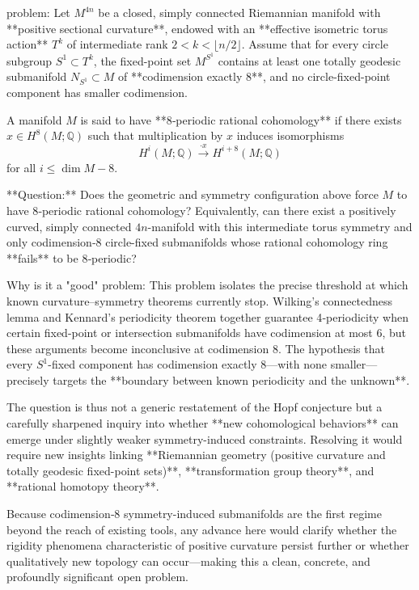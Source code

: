 problem:  
Let \( M^{4n} \) be a closed, simply connected Riemannian manifold with **positive sectional curvature**, endowed with an **effective isometric torus action** \( T^k \) of intermediate rank \( 2 < k < \lfloor n/2 \rfloor \).  
Assume that for every circle subgroup \( S^1 \subset T^k \), the fixed-point set \( M^{S^1} \) contains at least one totally geodesic submanifold \( N_{S^1} \subset M \) of **codimension exactly \(8\)**, and no circle-fixed-point component has smaller codimension.  

A manifold \(M\) is said to have **8‑periodic rational cohomology** if there exists \(x \in H^8(M;\mathbb{Q})\) such that multiplication by \(x\) induces isomorphisms  
\[
H^i(M;\mathbb{Q}) \xrightarrow{\cdot x} H^{i+8}(M;\mathbb{Q})
\]
for all \( i \le \dim M - 8.\)  

**Question:**  
Does the geometric and symmetry configuration above force \(M\) to have 8‑periodic rational cohomology?  
Equivalently, can there exist a positively curved, simply connected \(4n\)-manifold with this intermediate torus symmetry and only codimension‑8 circle-fixed submanifolds whose rational cohomology ring **fails** to be 8‑periodic?

Why is it a "good" problem:  
This problem isolates the precise threshold at which known curvature–symmetry theorems currently stop. Wilking’s connectedness lemma and Kennard’s periodicity theorem together guarantee 4‑periodicity when certain fixed-point or intersection submanifolds have codimension at most 6, but these arguments become inconclusive at codimension 8. The hypothesis that every \(S^1\)-fixed component has codimension exactly 8—with none smaller—precisely targets the **boundary between known periodicity and the unknown**.  

The question is thus not a generic restatement of the Hopf conjecture but a carefully sharpened inquiry into whether **new cohomological behaviors** can emerge under slightly weaker symmetry-induced constraints. Resolving it would require new insights linking **Riemannian geometry (positive curvature and totally geodesic fixed-point sets)**, **transformation group theory**, and **rational homotopy theory**.  

Because codimension‑8 symmetry-induced submanifolds are the first regime beyond the reach of existing tools, any advance here would clarify whether the rigidity phenomena characteristic of positive curvature persist further or whether qualitatively new topology can occur—making this a clean, concrete, and profoundly significant open problem.